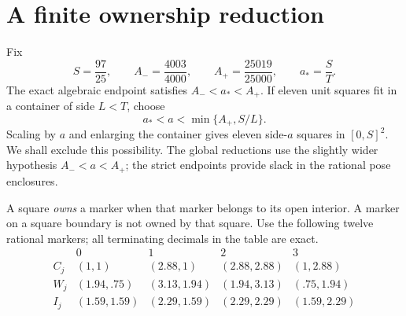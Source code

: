\documentclass[11pt]{article}
\begin{document}
\section{A finite ownership reduction}
\label{hybrid:ownership}

Fix
\[
 S=\frac{97}{25},\qquad A_- =\frac{4003}{4000},\qquad
 A_+=\frac{25019}{25000},\qquad a_* =\frac{S}{T}.
\]
The exact algebraic endpoint satisfies $A_-<a_*<A_+$.
If eleven unit squares fit in a container of side $L<T$, choose
\[
 a_*<a<\min\{A_+,S/L\}.
\]
Scaling by $a$ and enlarging the container gives eleven side-$a$ squares
in $[0,S]^2$. We shall exclude this possibility. The global reductions
use the slightly wider hypothesis $A_-<a<A_+$; the strict endpoints
provide slack in the rational pose enclosures.

A square \emph{owns} a marker when that marker belongs to its open
interior. A marker on a square boundary is not owned by that square.
Use the following twelve rational markers; all terminating decimals in
the table are exact.
\[
\begin{array}{c|cccc}
 &0&1&2&3\\ \hline
 C_j &(1,1)&(2.88,1)&(2.88,2.88)&(1,2.88)\\
 W_j &(1.94,.75)&(3.13,1.94)&(1.94,3.13)&(.75,1.94)\\
 I_j &(1.59,1.59)&(2.29,1.59)&(2.29,2.29)&(1.59,2.29)
\end{array}
\]
\end{document}
